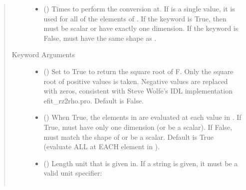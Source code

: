 \documentclass[letterpaper,10pt,english]{sphinxmanual}
\begin{document}
\begin{fulllineitems}
\begin{fulllineitems}
\begin{quote}
\begin{description}
\begin{itemize}
\item {} 
 () \textendash{} Times to perform the conversion at.
If  is a single value, it is used for all of the elements of
. If the  keyword is True, then  must be scalar
or have exactly one dimension. If the  keyword is False,
 must have the same shape as .

\end{itemize}

\item[{Keyword Arguments}] \leavevmode\begin{itemize}
\item {} 
 () \textendash{} Set to True to return the square root of F.
Only the square root of positive values is taken. Negative
values are replaced with zeros, consistent with Steve Wolfe’s
IDL implementation efit\_rz2rho.pro. Default is False.

\item {} 
 () \textendash{} When True, the elements in  are evaluated
at each value in . If True,  must have only one dimension
(or be a scalar). If False,  must match the shape of 
or be a scalar. Default is True (evaluate ALL  at EACH
element in ).

\item {} 
 () \textendash{} 
Length unit that  is given in.
If a string is given, it must be a valid unit specifier:
\begin{quote}


\begin{savenotes}\sphinxattablestart
\centering
\begin{tabulary}{\linewidth}[t]{|T|T|}
\hline


\end{tabulary}
\end{savenotes}
\end{quote}
\end{itemize}
\end{description}
\end{quote}
\end{fulllineitems}
\end{fulllineitems}
\end{document}
